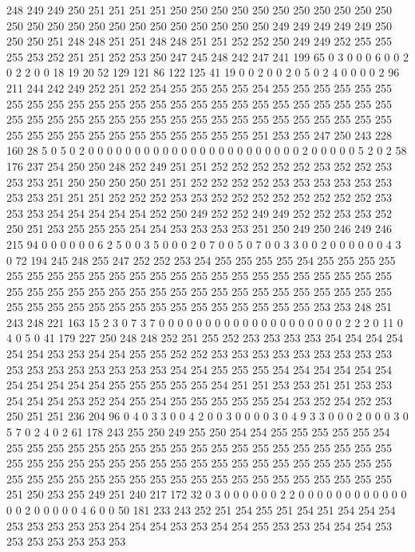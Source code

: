 248 249 249 250 251 251 251 251 250 250 250 250 250 250 250 250 250 250 250 250
250 250 250 250 250 250 250 250 250 250 250 250 249 249 249 249 249 250 250 250
251 248 248 251 251 248 248 251 251 252 252 250 249 249 252 255 255 255 253 252
251 251 252 253 250 247 245 248 242 247 241 199 65 0 3 0 0 0 6 0
0 2 0 2 2 0 0 18 19 20 52 129 121 86 122 125 41 19 0 0
2 0 0 2 0 5 0 2 4 0 0 0 0 2 96 211 244 242 249 252
251 252 254 255 255 255 255 254 255 255 255 255 255 255 255 255 255 255 255 255
255 255 255 255 255 255 255 255 255 255 255 255 255 255 255 255 255 255 255 255
255 255 255 255 255 255 255 255 255 255 255 255 255 255 255 255 255 255 255 255
255 255 255 255 251 253 255 247 250 243 228 160 28 5 0 5 0 2 0 0
0 0 0 0 0 0 0 0 0 0 0 0 0 0 0 0 0 0 0 0
0 2 0 0 0 0 0 5 2 0 2 58 176 237 254 250 250 248 252 249
251 251 252 252 252 252 252 253 252 252 253 253 253 251 250 250 250 250 251 251
252 252 252 252 253 253 253 253 253 253 253 253 251 251 251 252 252 252 253 253
252 252 252 252 252 252 252 252 253 253 253 254 254 254 254 254 252 250 249 252
252 249 249 252 252 253 253 252 250 251 253 255 255 255 254 254 253 253 253 253
251 250 249 250 246 249 246 215 94 0 0 0 0 0 0 6 2 5 0 0
3 5 0 0 0 2 0 7 0 0 5 0 7 0 0 3 3 0 0 2
0 0 0 0 0 0 4 3 0 72 194 245 248 255 247 252 252 253 254 255
255 255 255 254 255 255 255 255 255 255 255 255 255 255 255 255 255 255 255 255
255 255 255 255 255 255 255 255 255 255 255 255 255 255 255 255 255 255 255 255
255 255 255 255 255 255 255 255 255 255 255 255 255 255 255 255 255 255 255 255
255 253 253 248 251 243 248 221 163 15 2 3 0 7 3 7 0 0 0 0
0 0 0 0 0 0 0 0 0 0 0 0 0 0 0 0 2 2 2 0
11 0 4 0 5 0 41 179 227 250 248 248 252 251 255 252 253 253 253 253
254 254 254 254 254 254 253 253 254 254 255 255 252 252 253 253 253 253 253 253
253 253 253 253 253 253 253 253 253 253 253 254 254 255 255 255 254 254 254 254
254 254 254 254 254 254 254 255 255 255 255 255 254 251 251 253 253 251 251 253
253 254 254 254 253 252 254 255 254 255 255 255 255 255 254 253 252 254 252 253
250 251 251 236 204 96 0 4 0 3 3 0 0 4 2 0 0 3 0 0
0 0 3 0 4 9 3 3 0 0 0 2 0 0 0 3 0 5 7 0
2 4 0 2 61 178 243 255 250 249 255 250 254 254 255 255 255 255 255 254
255 255 255 255 255 255 255 255 255 255 255 255 255 255 255 255 255 255 255 255
255 255 255 255 255 255 255 255 255 255 255 255 255 255 255 255 255 255 255 255
255 255 255 255 255 255 255 255 255 255 255 255 255 255 255 255 255 251 250 253
255 249 251 240 217 172 32 0 3 0 0 0 0 0 0 2 2 0 0 0
0 0 0 0 0 0 0 0 0 0 0 2 0 0 0 0 0 4 6 0
0 50 181 233 243 252 251 254 255 251 254 251 254 254 254 253 253 253 253 253
254 254 254 253 253 254 254 255 253 253 254 254 254 253 253 253 253 253 253 253
